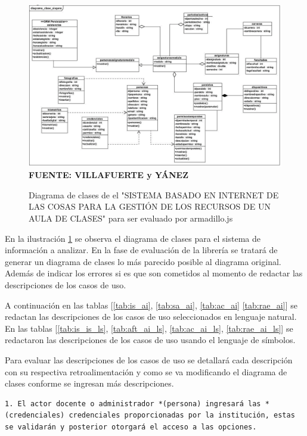 \begin{figure}[h!]
	\centering
	\caption{Diagrama de clases de el "SISTEMA BASADO EN INTERNET DE LAS COSAS PARA LA GESTIÓN DE LOS RECURSOS DE UN AULA DE CLASES" para ser evaluado por armadillo.js}
	\includegraphics[width=13cm]{img/dclases-ai.png}
	\label{fig:dc_aula_inteligente}
	\vspace{4mm}
	{\footnotesize \textbf{\\ FUENTE: VILLAFUERTE y YÁNEZ \cite{Villafuerte2020}}}
\end{figure}

En la ilustración \ref{fig:dc_aula_inteligente} se observa el diagrama de clases para el sistema de información a analizar. En la fase de evaluación de la librería se tratará de generar un diagrama de clases lo más parecido posible al diagrama original. Además de indicar los errores si es que son cometidos al momento de redactar las descripciones de los casos de uso. 

A continuación en las tablas [\ref{tab:is_ai}, \ref{tab:sa_ai}, \ref{tab:ac_ai} \ref{tab:rae_ai}] se redactan las descripciones de los casos de uso seleccionados en lenguaje natural. En las tablas [\ref{tab:is_is_ls}, \ref{tab:aft_ai_ls}, \ref{tab:ac_ai_ls}, \ref{tab:rae_ai_ls}] se redactaron las descripciones de los casos de uso usando el lenguaje de símbolos.

Para evaluar las descripciones de los casos de uso se detallará cada descripción con su respectiva retroalimentación y como se va modificando el diagrama de clases conforme se ingresan más descripciones.

\begin{lstlisting}[]
	1. El actor docente o administrador *(persona) ingresará las *(credenciales) credenciales proporcionadas por la institución, estas se validarán y posterior otorgará el acceso a las opciones. \end{lstlisting}

